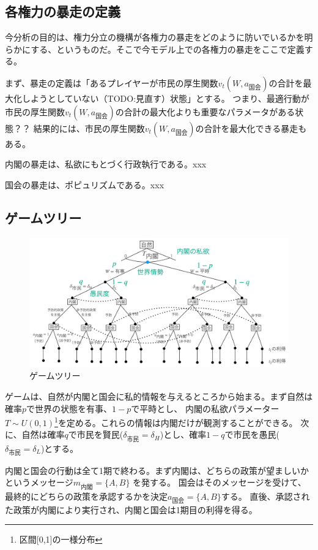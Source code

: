 \documentclass[main.tex]{subfiles}
\begin{document}
\subsection{各権力の暴走の定義}
今分析の目的は、権力分立の機構が各権力の暴走をどのように防いでいるかを明らかにする、というものだ。そこで今モデル上での各権力の暴走をここで定義する。

まず、暴走の定義は「あるプレイヤーが市民の厚生関数$v_t(W, a_{国会})$の合計を最大化しようとしていない（TODO:見直す）状態」とする。
つまり、最適行動が市民の厚生関数$v_t(W, a_{国会})$の合計の最大化よりも重要なパラメータがある状態？？
結果的には、市民の厚生関数$v_t(W, a_{国会})$の合計を最大化できる暴走もある。

内閣の暴走は、私欲にもとづく行政執行である。xxx

国会の暴走は、ポピュリズムである。xxx



\subsection{ゲームツリー}

\begin{figure}[htbp]
  \centering
  \includegraphics[width=1\textwidth]{./image/game_tree.png}
  \caption{ゲームツリー} 
  \label{fig:game_tree}
\end{figure}



ゲームは、自然が内閣と国会に私的情報を与えるところから始まる。まず自然は確率$p$で世界の状態を有事、$1-p$で平時とし、
内閣の私欲パラメーター$T\sim U(0,1)$\footnote{区間[0,1]の一様分布}を定める。これらの情報は内閣だけが観測することができる。
次に、自然は確率$q$で市民を賢民($\delta_{市民}=\delta_H$)とし、確率$1-q$で市民を愚民($\delta_{市民}=\delta_L$)とする。

内閣と国会の行動は全て1期で終わる。まず内閣は、どちらの政策が望ましいかというメッセージ$m_{内閣} = \lbrace A, B \rbrace$ を発する。
国会はそのメッセージを受けて、最終的にどちらの政策を承認するかを決定$a_{国会} = \lbrace A, B\rbrace$する。
直後、承認された政策が内閣により実行され、内閣と国会は1期目の利得を得る。
\end{document}
